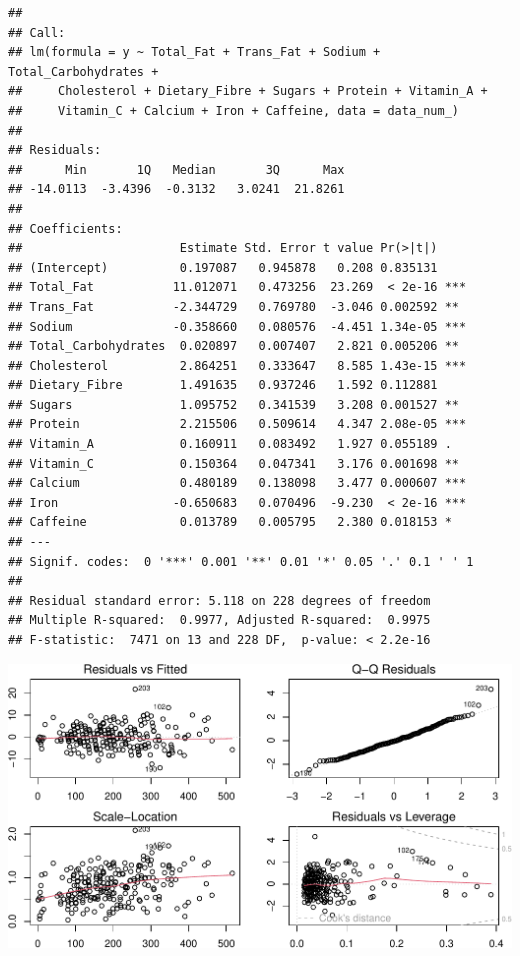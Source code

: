 \documentclass[
]{article}
\begin{document}
\begin{verbatim}
## 
## Call:
## lm(formula = y ~ Total_Fat + Trans_Fat + Sodium + Total_Carbohydrates + 
##     Cholesterol + Dietary_Fibre + Sugars + Protein + Vitamin_A + 
##     Vitamin_C + Calcium + Iron + Caffeine, data = data_num_)
## 
## Residuals:
##      Min       1Q   Median       3Q      Max 
## -14.0113  -3.4396  -0.3132   3.0241  21.8261 
## 
## Coefficients:
##                      Estimate Std. Error t value Pr(>|t|)    
## (Intercept)          0.197087   0.945878   0.208 0.835131    
## Total_Fat           11.012071   0.473256  23.269  < 2e-16 ***
## Trans_Fat           -2.344729   0.769780  -3.046 0.002592 ** 
## Sodium              -0.358660   0.080576  -4.451 1.34e-05 ***
## Total_Carbohydrates  0.020897   0.007407   2.821 0.005206 ** 
## Cholesterol          2.864251   0.333647   8.585 1.43e-15 ***
## Dietary_Fibre        1.491635   0.937246   1.592 0.112881    
## Sugars               1.095752   0.341539   3.208 0.001527 ** 
## Protein              2.215506   0.509614   4.347 2.08e-05 ***
## Vitamin_A            0.160911   0.083492   1.927 0.055189 .  
## Vitamin_C            0.150364   0.047341   3.176 0.001698 ** 
## Calcium              0.480189   0.138098   3.477 0.000607 ***
## Iron                -0.650683   0.070496  -9.230  < 2e-16 ***
## Caffeine             0.013789   0.005795   2.380 0.018153 *  
## ---
## Signif. codes:  0 '***' 0.001 '**' 0.01 '*' 0.05 '.' 0.1 ' ' 1
## 
## Residual standard error: 5.118 on 228 degrees of freedom
## Multiple R-squared:  0.9977, Adjusted R-squared:  0.9975 
## F-statistic:  7471 on 13 and 228 DF,  p-value: < 2.2e-16
\end{verbatim}

\begin{center}\includegraphics{Statistical_Learning_Final_Report_files/figure-latex/backward_elimination-1} \end{center}
\end{document}
